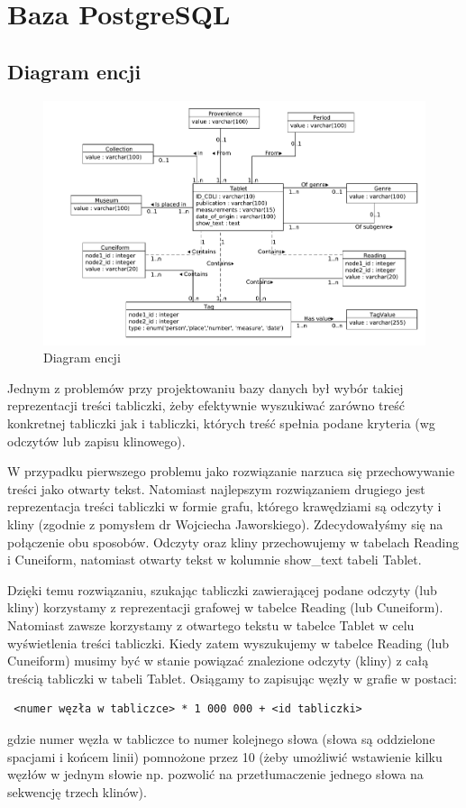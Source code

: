 \section{Baza PostgreSQL}
\subsection{Diagram encji}
\begin{figure}[h]
 \centering
 \includegraphics[width=500px,bb=0 0 930 560]{../diagramy/diagram-encji-maly.pdf}
 \caption{Diagram encji}
\end{figure}
Jednym z problemów przy projektowaniu bazy danych był wybór takiej reprezentacji treści tabliczki, 
żeby efektywnie wyszukiwać zarówno treść konkretnej tabliczki jak i tabliczki, których treść spełnia podane kryteria
 (wg odczytów lub zapisu klinowego).

W przypadku pierwszego problemu jako rozwiązanie narzuca się przechowywanie treści
jako otwarty tekst.
Natomiast najlepszym rozwiązaniem drugiego jest reprezentacja treści tabliczki
w formie grafu, którego krawędziami są odczyty i kliny (zgodnie z pomysłem dr Wojciecha Jaworskiego\cite[s.13-24]{jaworski}).
Zdecydowałyśmy się na połączenie obu sposobów. Odczyty oraz kliny przechowujemy w tabelach Reading i Cuneiform, 
natomiast otwarty tekst w kolumnie show\_text tabeli Tablet. 

Dzięki temu rozwiązaniu, szukając tabliczki zawierającej podane odczyty (lub kliny) korzystamy z reprezentacji
grafowej w tabelce Reading (lub Cuneiform).
Natomiast zawsze korzystamy z otwartego tekstu w tabelce Tablet w celu wyświetlenia treści tabliczki.
Kiedy zatem wyszukujemy w tabelce Reading (lub Cuneiform) musimy być w stanie powiązać znalezione odczyty (kliny) 
z całą treścią tabliczki w tabeli Tablet. Osiągamy to zapisując węzły w grafie w postaci:
\begin{verbatim}
 <numer węzła w tabliczce> * 1 000 000 + <id tabliczki>
\end{verbatim}
gdzie numer węzła w tabliczce to numer kolejnego słowa (słowa są oddzielone spacjami i końcem linii) pomnożone przez 10 
(żeby umożliwić wstawienie kilku węzłów w jednym słowie np. pozwolić na przetłumaczenie jednego słowa na sekwencję trzech klinów). 


